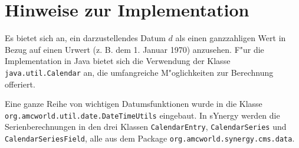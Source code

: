 \documentclass[a4paper]{article}
\numberwithin{equation}{section}
\begin{document}
%
%
%
%
\section{Hinweise zur Implementation}
Es bietet sich an, ein darzustellendes Datum $d$ als einen ganzzahligen Wert in
Bezug auf einen Urwert (z. B. dem 1. Januar 1970) anzusehen. F"ur die
Implementation in Java bietet sich die Verwendung der Klasse
\texttt{java.util.Calendar} an, die umfangreiche M"oglichkeiten zur Berechnung
offeriert.

Eine ganze Reihe von wichtigen Datumsfunktionen wurde in die Klasse
\texttt{org.amcworld.util.date.DateTimeUtils} eingebaut. In sYnergy werden die
Serienberechnungen in den drei Klassen \texttt{CalendarEntry},
\texttt{CalendarSeries} und \texttt{CalendarSeriesField}, alle aus dem Package
\texttt{org.amcworld.synergy.cms.\-data}.
\end{document}
